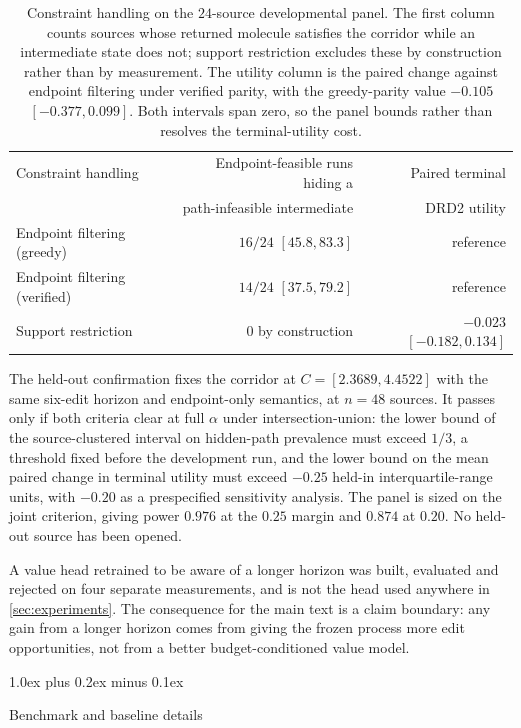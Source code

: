 \documentclass{article}
\makeatletter
\theoremstyle{definition}
\theoremstyle{remark}
\def\section{\@startsection{section}{1}{\z@}{-1.4ex plus -0.4ex minus -.2ex}%
  {1.0ex plus 0.2ex minus 0.1ex}{\large\sc\raggedright}}
\makeatother
\begin{document}
\begin{table}[h]
\centering
{\small
\begin{tabular}{lrr}
\toprule
Constraint handling & Endpoint-feasible runs hiding a & Paired terminal \\
 & path-infeasible intermediate & DRD2 utility \\
\midrule
Endpoint filtering (greedy)   & $16/24$ $[45.8,83.3]$ & reference \\
Endpoint filtering (verified) & $14/24$ $[37.5,79.2]$ & reference \\
Support restriction           & $0$ by construction   & $-0.023$ $[-0.182,0.134]$ \\
\bottomrule
\end{tabular}}
\caption{\small Constraint handling on the $24$-source developmental panel. The
first column counts sources whose returned molecule satisfies the corridor while
an intermediate state does not; support restriction excludes these by
construction rather than by measurement. The utility column is the paired change
against endpoint filtering under verified parity, with the greedy-parity value
$-0.105$ $[-0.377,0.099]$. Both intervals span zero, so the panel bounds rather
than resolves the terminal-utility cost.}
\label{tab:pathwise-arms}
\end{table}

The held-out confirmation fixes the corridor at $C=[2.3689,4.4522]$ with the same six-edit horizon and endpoint-only semantics, at $n=48$ sources. It passes only if both criteria clear at full $\alpha$ under intersection-union: the lower bound of the source-clustered interval on hidden-path prevalence must exceed $1/3$, a threshold fixed before the development run, and the lower bound on the mean paired change in terminal utility must exceed $-0.25$ held-in interquartile-range units, with $-0.20$ as a prespecified sensitivity analysis. The panel is sized on the joint criterion, giving power $0.976$ at the $0.25$ margin and $0.874$ at $0.20$. No held-out source has been opened.

A value head retrained to be aware of a longer horizon was built, evaluated and rejected on four separate measurements, and is not the head used anywhere in \cref{sec:experiments}. The consequence for the main text is a claim boundary: any gain from a longer horizon comes from giving the frozen process more edit opportunities, not from a better budget-conditioned value model.

\section{Benchmark and baseline details}
\label{app:alignment}
\end{document}
